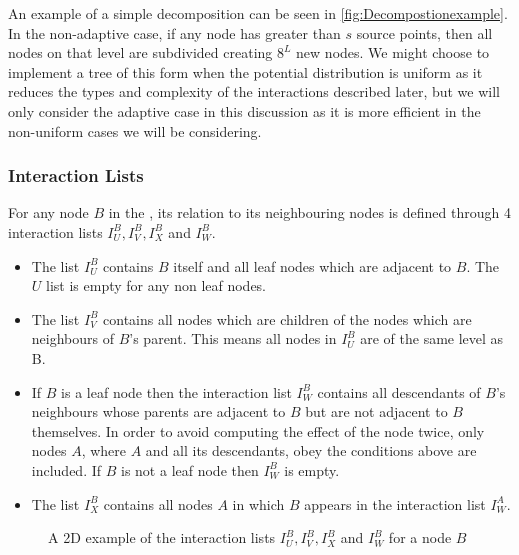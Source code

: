 An example of a simple decomposition can be seen in \cref{fig:Decompostionexample}. In the non-adaptive case, if any node has greater than $s$ source points, then all nodes on that level are subdivided creating $8^L$ new nodes. We might choose to implement a tree of this form when the potential distribution is uniform as it reduces the types and complexity of the interactions described later, but we will only consider the adaptive case in this discussion as it is more efficient in the non-uniform cases we will be considering.

\subsubsection{Interaction Lists}
For any node $B$ in the , its relation to its neighbouring nodes is defined through 4 interaction lists $I_U^B, I_V^B, I_X^B$ and $I_W^B$.

\begin{itemize}
\item The list $I^B_U$ contains $B$ itself and all leaf nodes which are adjacent to $B$. The $U$ list is empty for any non leaf nodes.

\item The list $I_V^B$ contains all nodes which are children of the nodes which are neighbours of $B$'s parent. This means all nodes in $I_U^B$ are of the same level as B.

\item If $B$ is a leaf node then the interaction list $I_W^B$ contains all descendants of $B$'s neighbours whose parents are adjacent to $B$ but are not adjacent to $B$ themselves. In order to avoid computing the effect of the node twice, only nodes $A$, where $A$ and all its descendants, obey the conditions above are included. If $B$ is not a leaf node then $I_W^B$ is empty.

\item The list $I_X^B$ contains all nodes $A$ in which $B$ appears in the interaction list $I_W^A$.
\end{itemize}

\begin{figure}
    \centering
    \resizebox{.5\linewidth}{!}{}
    \caption{A 2D example of the interaction lists $I_U^B, I_V^B, I_X^B$ and $I_W^B$ for a node $B$}
    \label{fig:InteractionsLists}
\end{figure}


